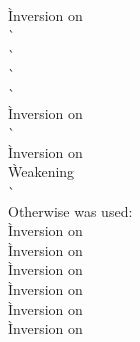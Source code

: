 \begin{description}
\begin{tabbing}
     \\
      \` Inversion on  \\
      \`  \\
      \`  \\
      \`  \\
      \`  \\
      \` Inversion on  \\
      \`  \\
      \` Inversion on  \\
      \` Weakening \\
      \`  \- \\
  Otherwise  was used: \+ \\
      \` Inversion on  \\
      \` Inversion on  \\
      \` Inversion on  \\
      \` Inversion on  \\
      \` Inversion on  \\
      \` Inversion on  \\

\end{tabbing}
\end{description}
